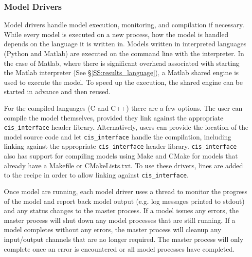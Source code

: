 \documentclass[journal]{IEEEtran}
\newcommand{\cis}{{\tt cis\_interface}{}}
\begin{document}
%

\subsubsection{Model Drivers}\label{SS:model_driver}
%
Model drivers handle model execution, monitoring, and compilation if necessary. 
While every model is executed on a new process, how the model is handled depends 
on the language it is written in. Models written in 
interpreted languages (Python and Matlab) are executed on the command line 
with the interpreter. In the case of Matlab, where there is significant overhead 
associated with starting the Matlab interpreter (See \S\ref{SS:results_language}), a Matlab shared engine is used 
to execute the model. To speed up the execution, the shared engine can be started 
in advance and then reused.

For the compiled languages (C and C++) there are a few options. The user can 
compile the model themselves, provided they link against the appropriate 
{\cis} header library. Alternatively, users can provide the location of 
the model source code and let {\cis} handle the compilation, including 
linking against the appropriate {\cis} header library. {\cis} 
also has support for compiling models using Make \citep{Stallman2004} and 
CMake \citep{Martin2006} for 
models that already have a Makefile or CMakeLists.txt. To use these drivers, 
lines are added to the recipe in order to allow linking against {\cis}.

Once model are running, each model driver uses a thread to monitor the progress of the model and report back model output (e.g. log messages printed to stdout) and any status changes to the master process. If a model issues any errors, the master process will shut down any model processes that are still running. If a model completes without any errors, the master process will cleanup any input/output channels that are no longer required. The master process will only complete once an error is encountered or all model processes have completed.
\end{document}
